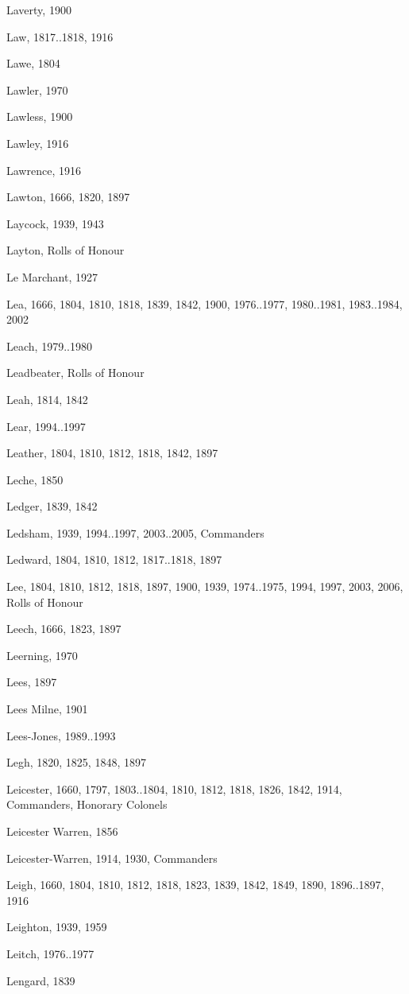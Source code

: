 {\begin{theindex}
\item Laverty, 1900
\item Law, 1817..1818, 1916
\item Lawe, 1804
\item Lawler, 1970
\item Lawless, 1900
\item Lawley, 1916
\item Lawrence, 1916
\item Lawton, 1666, 1820, 1897
\item Laycock, 1939, 1943
\item Layton, Rolls of Honour
\item Le Marchant, 1927
\item Lea, 1666, 1804, 1810, 1818, 1839, 1842, 1900, 1976..1977, 1980..1981, 1983..1984, 2002
\item Leach, 1979..1980
\item Leadbeater, Rolls of Honour
\item Leah, 1814, 1842
\item Lear, 1994..1997
\item Leather, 1804, 1810, 1812, 1818, 1842, 1897
\item Leche, 1850
\item Ledger, 1839, 1842
\item Ledsham, 1939, 1994..1997, 2003..2005, Commanders
\item Ledward, 1804, 1810, 1812, 1817..1818, 1897
\item Lee, 1804, 1810, 1812, 1818, 1897, 1900, 1939, 1974..1975, 1994, 1997, 2003, 2006, Rolls of Honour
\item Leech, 1666, 1823, 1897
\item Leerning, 1970
\item Lees, 1897
\item Lees Milne, 1901
\item Lees-Jones, 1989..1993
\item Legh, 1820, 1825, 1848, 1897
\item Leicester, 1660, 1797, 1803..1804, 1810, 1812, 1818, 1826, 1842, 1914, Commanders, Honorary Colonels
\item Leicester Warren, 1856
\item Leicester-Warren, 1914, 1930, Commanders
\item Leigh, 1660, 1804, 1810, 1812, 1818, 1823, 1839, 1842, 1849, 1890, 1896..1897, 1916
\item Leighton, 1939, 1959
\item Leitch, 1976..1977
\item Lengard, 1839

\end{theindex}}
